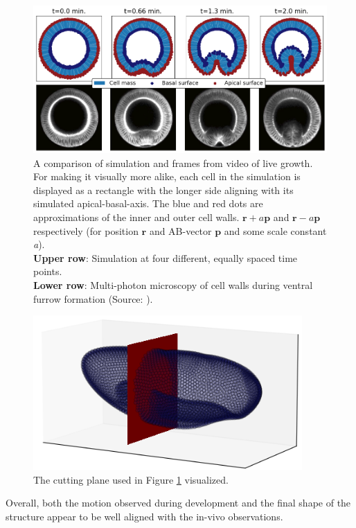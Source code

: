 \begin{figure}[H]
    \centering
    \includegraphics[width=1\linewidth]{chapters/Results/figures/VF_comparison.png}
    \caption{A comparison of simulation and frames from video of live growth. For making it visually more alike, each cell in the simulation is displayed as a rectangle with the longer side aligning with its simulated apical-basal-axis. The blue and red dots are approximations of the inner and outer cell walls. $\textbf{r} + a\textbf{p}$ and $\textbf{r}-a\textbf{p}$ respectively (for position $\textbf{r}$ and AB-vector $\textbf{p}$ and some scale constant \textit{a}).  \\\textbf{Upper row}: Simulation at four different, equally spaced time points. \\\textbf{Lower row}: Multi-photon microscopy of cell walls during ventral furrow formation (Source: ). \\}
    \label{fig:VFComparison}
\end{figure}

\begin{figure}[H]
    \centering
    \includegraphics[width=0.65\linewidth]{chapters/Results/figures/planecut2.png}
    \caption{The cutting plane used in Figure \ref{fig:VFComparison} visualized.}
\end{figure}
Overall, both the motion observed during development and the final shape of the structure appear to be well aligned with the in-vivo observations.\\

